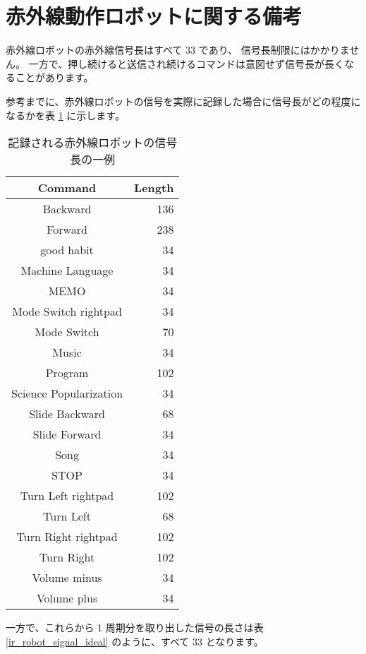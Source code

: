 \section{赤外線動作ロボットに関する備考} \label{ir_robot_notice}
赤外線ロボットの赤外線信号長はすべて 33 であり、
信号長制限にはかかりません。
一方で、押し続けると送信され続けるコマンドは意図せず信号長が長くなることがあります。

参考までに、赤外線ロボットの信号を実際に記録した場合に信号長がどの程度になるかを表 \ref{ir_robot_signal} に示します。

\begin{table}[htbp] \begin{center}
    \caption{記録される赤外線ロボットの信号長の一例}
    \label{ir_robot_signal}
    \begin{tabular}{cr}
\hline
Command & Length \\
\hline
Backward & 136 \\
Forward & 238 \\
good habit & 34 \\
Machine Language & 34 \\
MEMO & 34 \\
Mode Switch rightpad & 34 \\
Mode Switch & 70 \\
Music & 34 \\
Program & 102 \\
Science Popularization & 34 \\
Slide Backward & 68 \\
Slide Forward & 34 \\
Song & 34 \\
STOP & 34 \\
Turn Left rightpad & 102 \\
Turn Left & 68 \\
Turn Right rightpad & 102 \\
Turn Right & 102 \\
Volume minus & 34 \\
Volume plus & 34 \\
\hline
    \end{tabular}
\end{center} \end{table}

一方で、これらから 1 周期分を取り出した信号の長さは表 \ref{ir_robot_signal_ideal} のように、すべて 33 となります。


